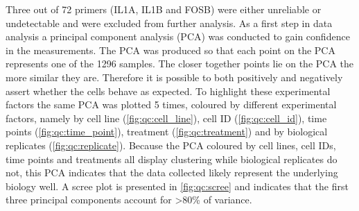 \documentclass[alpha-refs]{wiley-article}
\begin{document}
%
Three out of 72 primers (IL1A, IL1B and FOSB) were either unreliable or undetectable and were excluded from further analysis. As a first step in data analysis a principal component analysis (PCA) was conducted to gain confidence in the measurements. The PCA was produced so that each point on the PCA represents one of the 1296 samples. The closer together points lie on the PCA the more similar they are. Therefore it is possible to both positively and negatively assert whether the cells behave as expected. To highlight these experimental factors the same PCA was plotted 5 times, coloured by different experimental factors, namely by cell line (\cref{fig:qc:cell_line}), cell ID (\cref{fig:qc:cell_id}), time points (\cref{fig:qc:time_point}), treatment (\cref{fig:qc:treatment}) and by biological replicates (\cref{fig:qc:replicate}). Because the PCA coloured by cell lines, cell IDs, time points and treatments all display clustering while biological replicates do not, this PCA indicates that the data collected likely represent the underlying biology well. A scree plot is presented in \cref{fig:qc:scree} and indicates that the first three principal components account for >80\% of variance. 
\end{document}
